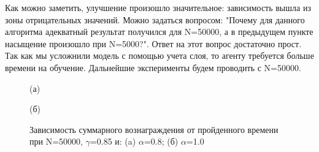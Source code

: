 \documentclass[a4paper]{report}
\theoremstyle{definition}
\theoremstyle{plain}
\theoremstyle{remark}
\theoremstyle{remark}
\theoremstyle{definition}
\begin{document}
Как можно заметить, улучшение произошло значительное: зависимость вышла из зоны отрицательных значений. Можно задаться вопросом: "Почему для данного алгоритма адекватный результат получился для N=50000, а в предыдущем пункте насыщение произошло при N=5000?". Ответ на этот вопрос достаточно прост. Так как мы усложнили модель с помощью учета слоя, то агенту требуется больше времени на обучение. Дальнейшие эксперименты будем проводить с N=50000.
\begin{figure}[H]
    \begin{minipage}[H]{0.49\linewidth}
        (а)\\
    \end{minipage}
    \hfill
    \begin{minipage}[H]{0.49\linewidth}
        (б)\\
    \end{minipage}
      \caption{Зависимость суммарного вознаграждения от пройденного времени при N=50000, $\gamma$=0.85 и: (a) $\alpha$=0.8; (б) $\alpha$=1.0}
\end{figure}
\end{document}
